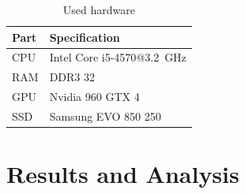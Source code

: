 \documentclass[12pt,twoside]{article}
\begin{document}
\begin{table}[h]
	\centering
	\caption{Used hardware}
	\label{tab:hw}
	\begin{tabu}{ll}
		\toprule[2pt]
		Part                               & Specification \\
		\midrule
		CPU                      & Intel Core i5-4570@\SI{3.2}{\giga\hertz}   \\
		RAM                             &   DDR3 \SI{32}{\giga\byte}     \\
		GPU                               & Nvidia 960 GTX \SI{4}{\giga\byte}         \\
		SSD                               & Samsung EVO 850 \SI{250}{\giga\byte}      \\
		\bottomrule[2pt]
	\end{tabu}
\end{table}
\section{Results and Analysis}
\label{sec:results}
\end{document}
